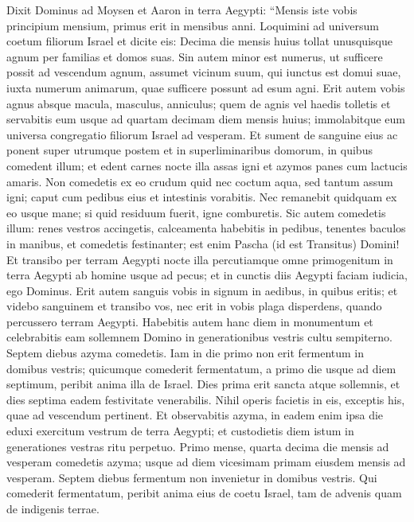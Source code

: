 \begin{biblechapter}  
\verse Dixit Dominus ad Moysen et Aaron in terra Aegypti: 
\verse “Mensis iste vobis principium mensium, primus erit in mensibus anni. 
\verse Loquimini ad universum coetum filiorum Israel et dicite eis: Decima die mensis huius tollat unusquisque agnum per familias et domos suas. 
\verse Sin autem minor est numerus, ut sufficere possit ad vescendum agnum, assumet vicinum suum, qui iunctus est domui suae, iuxta numerum animarum, quae sufficere possunt ad esum agni. 
\verse Erit autem vobis agnus absque macula, masculus, anniculus; quem de agnis vel haedis tolletis 
\verse et servabitis eum usque ad quartam decimam diem mensis huius; immolabitque eum universa congregatio filiorum Israel ad vesperam. 
\verse Et sument de sanguine eius ac ponent super utrumque postem et in superliminaribus domorum, in quibus comedent illum; 
\verse et edent carnes nocte illa assas igni et azymos panes cum lactucis amaris. 
\verse Non comedetis ex eo crudum quid nec coctum aqua, sed tantum assum igni; caput cum pedibus eius et intestinis vorabitis. 
\verse Nec remanebit quidquam ex eo usque mane; si quid residuum fuerit, igne comburetis. 
\verse Sic autem comedetis illum: renes vestros accingetis, calceamenta habebitis in pedibus, tenentes baculos in manibus, et comedetis festinanter; est enim Pascha (id est Transitus) Domini! 
\verse Et transibo per terram Aegypti nocte illa percutiamque omne primogenitum in terra Aegypti ab homine usque ad pecus; et in cunctis diis Aegypti faciam iudicia, ego Dominus. 
\verse Erit autem sanguis vobis in signum in aedibus, in quibus eritis; et videbo sanguinem et transibo vos, nec erit in vobis plaga disperdens, quando percussero terram Aegypti. 
\verse Habebitis autem hanc diem in monumentum et celebrabitis eam sollemnem Domino in generationibus vestris cultu sempiterno. 
\verse Septem diebus azyma comedetis. Iam in die primo non erit fermentum in domibus vestris; quicumque comederit fermentatum, a primo die usque ad diem septimum, peribit anima illa de Israel. 
\verse Dies prima erit sancta atque sollemnis, et dies septima eadem festivitate venerabilis. Nihil operis facietis in eis, exceptis his, quae ad vescendum pertinent. 
\verse Et observabitis azyma, in eadem enim ipsa die eduxi exercitum vestrum de terra Aegypti; et custodietis diem istum in generationes vestras ritu perpetuo. 
\verse Primo mense, quarta decima die mensis ad vesperam comedetis azyma; usque ad diem vicesimam primam eiusdem mensis ad vesperam. 
\verse Septem diebus fermentum non invenietur in domibus vestris. Qui comederit fermentatum, peribit anima eius de coetu Israel, tam de advenis quam de indigenis terrae. 

\end{biblechapter}
